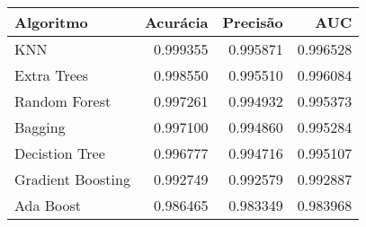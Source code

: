\begin{tabular}{lrrr}
\toprule
        Algoritmo &  Acurácia &  Precisão &      AUC \\
\midrule
              KNN &  0.999355 &  0.995871 & 0.996528 \\
      Extra Trees &  0.998550 &  0.995510 & 0.996084 \\
    Random Forest &  0.997261 &  0.994932 & 0.995373 \\
          Bagging &  0.997100 &  0.994860 & 0.995284 \\
   Decistion Tree &  0.996777 &  0.994716 & 0.995107 \\
Gradient Boosting &  0.992749 &  0.992579 & 0.992887 \\
        Ada Boost &  0.986465 &  0.983349 & 0.983968 \\
\bottomrule
\end{tabular}
